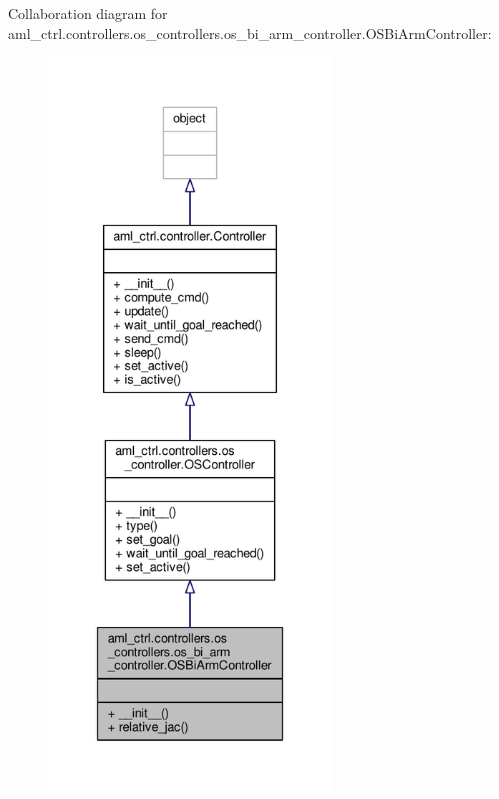Collaboration diagram for aml\-\_\-ctrl.\-controllers.\-os\-\_\-controllers.\-os\-\_\-bi\-\_\-arm\-\_\-controller.\-O\-S\-Bi\-Arm\-Controller\-:
\nopagebreak
\begin{figure}[H]
\begin{center}
\leavevmode
\includegraphics[height=550pt]{classaml__ctrl_1_1controllers_1_1os__controllers_1_1os__bi__arm__controller_1_1_o_s_bi_arm_controller__coll__graph}
\end{center}
\end{figure}
